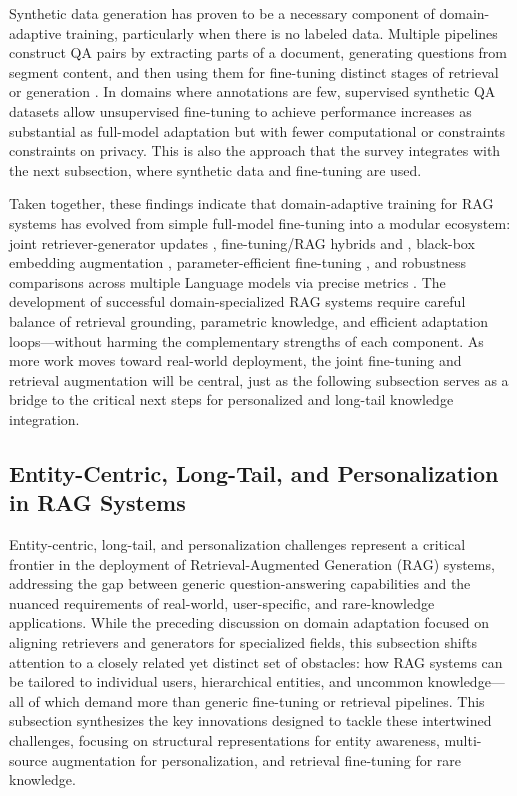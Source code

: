\documentclass[11pt]{article}
\begin{document}
Synthetic data generation has proven to be a necessary component of domain-adaptive training, particularly when there is no labeled data. Multiple pipelines construct QA pairs by extracting parts of a document, generating questions from segment content, and then using them for fine-tuning distinct stages of retrieval or generation \cite{ref213}. In domains where annotations are few, supervised synthetic QA datasets allow unsupervised fine-tuning to achieve performance increases as substantial as full-model adaptation but with fewer computational or constraints constraints on privacy. This is also the approach that the survey integrates with the next subsection, where synthetic data and fine-tuning are used.

Taken together, these findings indicate that domain-adaptive training for RAG systems has evolved from simple full-model fine-tuning into a modular ecosystem: joint retriever-generator updates \cite{ref78}, fine-tuning/RAG hybrids \cite{ref217} and \cite{ref74}, black-box embedding augmentation \cite{ref54}, parameter-efficient fine-tuning \cite{ref216}, and robustness comparisons across multiple Language models via precise metrics \cite{ref215}. The development of successful domain-specialized RAG systems require careful balance of retrieval grounding, parametric knowledge, and efficient adaptation loops---without harming the complementary strengths of each component. As more work moves toward real-world deployment, the joint fine-tuning and retrieval augmentation will be central, just as the following subsection serves as a bridge to the critical next steps for personalized and long-tail knowledge integration.

\subsection{Entity-Centric, Long-Tail, and Personalization in RAG Systems}

Entity-centric, long-tail, and personalization challenges represent a critical frontier in the deployment of Retrieval-Augmented Generation (RAG) systems, addressing the gap between generic question-answering capabilities and the nuanced requirements of real-world, user-specific, and rare-knowledge applications. While the preceding discussion on domain adaptation focused on aligning retrievers and generators for specialized fields, this subsection shifts attention to a closely related yet distinct set of obstacles: how RAG systems can be tailored to individual users, hierarchical entities, and uncommon knowledge---all of which demand more than generic fine-tuning or retrieval pipelines. This subsection synthesizes the key innovations designed to tackle these intertwined challenges, focusing on structural representations for entity awareness, multi-source augmentation for personalization, and retrieval fine-tuning for rare knowledge.
\end{document}
